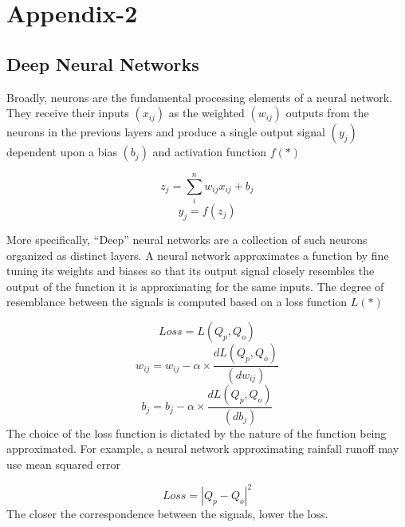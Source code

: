 \chapter{Appendix-2}\label{Appendix-2}
\section{Deep Neural Networks}\label{SI:neuralnets}
Broadly, neurons are the fundamental processing elements of a neural network.
They receive their inputs $(x_{ij})$ as the weighted $(w_{ij})$ outputs from the neurons in the previous layers and produce a single output signal $(y_j)$ dependent upon a bias $(b_j)$ and activation function $f(*)$

\begin{equation}
      z_j = \sum_i^n w_{ij}  x_{ij}+b_j
\end{equation}
\begin{equation}
    y_j = f(z_j)
\end{equation}

More specifically, “Deep” neural networks are a collection of such neurons organized as distinct layers.
A neural network approximates a function by fine tuning its weights and biases so that its output signal closely resembles the output of the function it is approximating for the same inputs.
The degree of resemblance between the signals is computed based on a loss function $L(*)$

\begin{equation}
    Loss = L(Q_p,Q_o)
\end{equation}
\begin{equation}
    w_{ij} = w_{ij}- \alpha \times  \frac{dL(Q_p,Q_o )}{(dw_{ij})}
\end{equation}
\begin{equation}
    b_j = b_j- \alpha \times  \frac{dL(Q_p,Q_o )}{(db_j)}
\end{equation}
The choice of the loss function is dictated by the nature of the function being approximated.
For example, a neural network approximating rainfall runoff may use mean squared error\cite{tokar1999rainfall}

\begin{equation}
    Loss = |Q_p-Q_o|^2
\end{equation}
The closer the correspondence between the signals, lower the loss.

\

